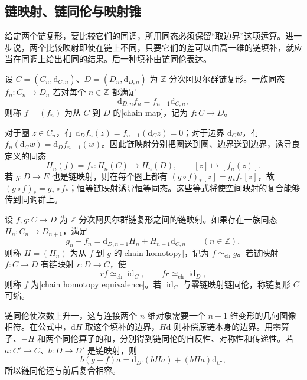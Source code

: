 \subsection{链映射、链同伦与映射锥}
\label{g2:subsec:0201:02}
给定两个链复形，要比较它们的同调，所用同态必须保留“取边界”这项运算。进一步说，两个比较映射即使在链上不同，只要它们的差可以由高一维的链填补，就应当在同调上给出相同的结果。后一种填补由链同伦表达。

\begin{definition}[链映射]\label{g2:def:chain-map}
	设 \(C=(C_n,\mathrm{d}_{C,n})\)、\(D=(D_n,\mathrm{d}_{D,n})\) 为 \(\mathbb Z\) 分次阿贝尔群链复形。一族同态 \(f_n:C_n\to D_n\) 若对每个 \(n\in\mathbb Z\) 都满足
	\[
		\mathrm{d}_{D,n}f_n=f_{n-1}\mathrm{d}_{C,n},
	\]
	则称 \(f=(f_n)\) 为从 \(C\) 到 \(D\) 的[chain map]，记为 \(f:C\to D\)。
\end{definition}

对于圈 \(z\in C_n\)，有 \(\mathrm{d}_Df_n(z)=f_{n-1}(\mathrm{d}_Cz)=0\)；对于边界 \(\mathrm{d}_Cw\)，有 \(f_n(\mathrm{d}_Cw)=\mathrm{d}_Df_{n+1}(w)\)。因此链映射分别把圈送到圈、边界送到边界，诱导良定义的同态
\[
	H_n(f)=f_*:H_n(C)\longrightarrow H_n(D),\qquad [z]\longmapsto[f_n(z)].
\]
若 \(g:D\to E\) 也是链映射，则在每个圈上都有 \((g\circ f)_*[z]=g_*f_*[z]\)，故 \((g\circ f)_*=g_*\circ f_*\)；恒等链映射诱导恒等同态。这些等式将使空间映射的复合能够传到同调群上。

\begin{definition}[链同伦与链同伦等价]\label{g2:def:chain-homotopy}
	设 \(f,g:C\to D\) 为 \(\mathbb Z\) 分次阿贝尔群链复形之间的链映射。如果存在一族同态 \(H_n:C_n\to D_{n+1}\)，满足
	\[
		g_n-f_n=\mathrm{d}_{D,n+1}H_n+H_{n-1}\mathrm{d}_{C,n}
		\qquad(n\in\mathbb Z),
	\]
	则称 \(H=(H_n)\) 为从 \(f\) 到 \(g\) 的[chain homotopy]，记为 \(f\simeq_{\mathrm{ch}}g\)。若链映射 \(f:C\to D\) 有链映射 \(r:D\to C\)，使
	\[
		rf\simeq_{\mathrm{ch}}\operatorname{id}_C,\qquad
		fr\simeq_{\mathrm{ch}}\operatorname{id}_D,
	\]
	则称 \(f\) 为[chain homotopy equivalence]。若 \(\operatorname{id}_C\) 与零链映射链同伦，称链复形 \(C\) 可缩。
\end{definition}

链同伦使次数上升一，这与连接两个 \(n\) 维对象需要一个 \(n+1\) 维变形的几何图像相符。在公式中，\(\mathrm{d}H\) 取这个填补的边界，\(H\mathrm{d}\) 则补偿原链本身的边界。用零算子、\(-H\) 和两个同伦算子的和，分别得到链同伦的自反性、对称性和传递性。若 \(a:C'\to C\)、\(b:D\to D'\) 是链映射，则
\[
	b(g-f)a
	=\mathrm{d}_{D'}(bHa)+(bHa)\mathrm{d}_{C'},
\]
所以链同伦还与前后复合相容。

